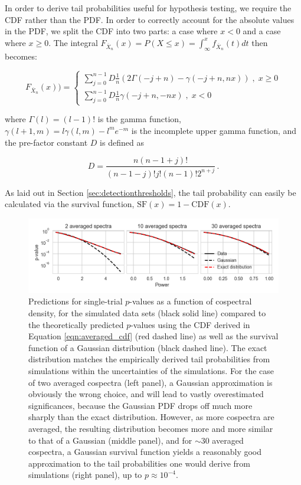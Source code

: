 \documentclass[12pt]{emulateapj}
\begin{document}
In order to derive tail probabilities useful for hypothesis testing, we require the CDF rather than the PDF. In order to correctly account for the absolute values in the PDF, we split the CDF into two parts: a case where $x < 0$ and a case where $x \geq 0$. The integral $F_{\overline{X}_n}(x) = P ( X \leq x) = \int_{\infty}^{x} f_{\overline{X}_n}(t) dt$ then becomes:

\begin{equation}
\label{eqn:averaged_cdf}
F_{\overline{X}_n}(x)) = 
  \begin{cases} 
   \sum_{j=0}^{n-1} D \frac{1}{n}(2\Gamma(-j+n) - \gamma(-j+n, nx)) \;, \;x \geq 0 \\
     \sum_{j=0}^{n-1} D  \frac{1}{n}\gamma(-j+n, -nx) \;,\; x < 0
  \end{cases}
\end{equation}

\noindent where $\Gamma(l)= (l-1)!$ is the gamma function, $\gamma(l+1, m) = l\gamma(l,m) - l^m e^{-m}$ is the incomplete upper gamma function, and the pre-factor constant $D$ is defined as 

\[
D = \frac{n(n-1+j)!}{(n-1-j)! j! (n-1)! 2^{n+j}} \, .
\]

\noindent As laid out in Section \ref{sec:detectionthresholds}, the tail probability can easily be calculated via the survival function, $\mathrm{SF}(x) = 1 - \mathrm{CDF}(x)$. 


\begin{figure}
\begin{center}
\includegraphics[width=\textwidth]{avg_pvalues.png}
\caption{Predictions for single-trial $p$-values as a function of cospectral density, for the simulated data sets (black solid line) compared to the theoretically predicted $p$-values using the CDF derived in Equation \ref{eqn:averaged_cdf} (red dashed line) as well as the survival function of a Gaussian distribution (black dashed line). The exact distribution matches the empirically derived tail probabilities from simulations within the uncertainties of the simulations. For the case of two averaged cospectra (left panel), a Gaussian approximation is obviously the wrong choice, and will lead to vastly overestimated significances, because the Gaussian PDF drops off much more sharply than the exact distribution. However, as more cospectra are averaged, the resulting distribution becomes more and more similar to that of a Gaussian (middle panel), and for $\sim$30 averaged cospectra, a Gaussian survival function yields a reasonably good approximation to the tail probabilities one would derive from simulations (right panel), up to $p \approx 10^{-4}$.}
\label{fig:avg_pvalue}
\end{center}
\end{figure}
\end{document}
